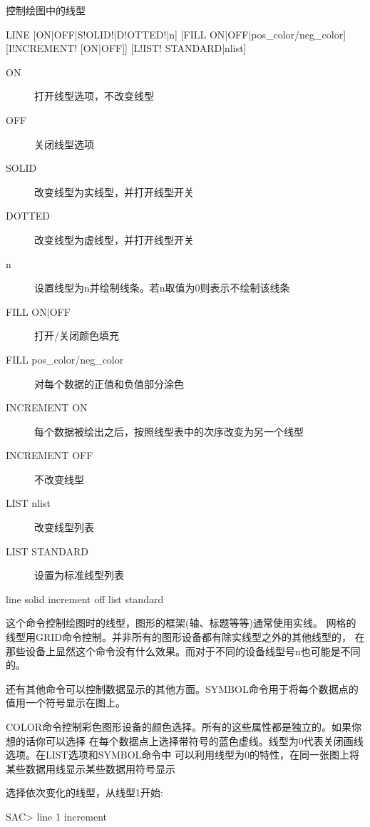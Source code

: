 \label{cmd:line}

控制绘图中的线型

\begin{SACSTX}
LINE [ON|OFF|S!OLID!|D!OTTED!|n] [FILL ON|OFF|pos\_color/neg\_color]
    [I!NCREMENT! [ON|OFF]] [L!IST! STANDARD|nlist]
\end{SACSTX}

\begin{description}
\item [ON] 打开线型选项，不改变线型
\item [OFF] 关闭线型选项
\item [SOLID] 改变线型为实线型，并打开线型开关
\item [DOTTED] 改变线型为虚线型，并打开线型开关
\item [n] 设置线型为n并绘制线条。若n取值为0则表示不绘制该线条
\item [FILL ON|OFF] 打开/关闭颜色填充
\item [FILL pos\_color/neg\_color] 对每个数据的正值和负值部分涂色
\item [INCREMENT ON] 每个数据被绘出之后，按照线型表中的次序改变为另一个线型
\item [INCREMENT OFF] 不改变线型
\item [LIST nlist] 改变线型列表
\item [LIST STANDARD] 设置为标准线型列表
\end{description}

\begin{SACDFT}
line solid increment off list standard
\end{SACDFT}

这个命令控制绘图时的线型，图形的框架(轴、标题等等)通常使用实线。
网格的线型用GRID命令控制。并非所有的图形设备都有除实线型之外的其他线型的，
在那些设备上显然这个命令没有什么效果。而对于不同的设备线型号n也可能是不同的。

还有其他命令可以控制数据显示的其他方面。SYMBOL命令用于将每个数据点的值用一个符号显示在图上。

COLOR命令控制彩色图形设备的颜色选择。所有的这些属性都是独立的。如果你想的话你可以选择
在每个数据点上选择带符号的蓝色虚线。线型为0代表关闭画线选项。在LIST选项和SYMBOL命令中
可以利用线型为0的特性，在同一张图上将某些数据用线显示某些数据用符号显示

选择依次变化的线型，从线型1开始:
\begin{SACCode}
SAC> line 1 increment
\end{SACCode}

